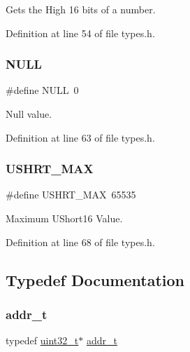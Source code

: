 Gets the High 16 bits of a number. 



Definition at line 54 of file types.\+h.

\mbox{\label{a00104_a070d2ce7b6bb7e5c05602aa8c308d0c4_a070d2ce7b6bb7e5c05602aa8c308d0c4}} 
\subsubsection{\texorpdfstring{N\+U\+LL}{NULL}}
{\footnotesize\ttfamily \#define N\+U\+LL~0}



Null value. 



Definition at line 63 of file types.\+h.

\mbox{\label{a00104_a689b119da994dece91d44b5aeac643ed_a689b119da994dece91d44b5aeac643ed}} 
\subsubsection{\texorpdfstring{U\+S\+H\+R\+T\+\_\+\+M\+AX}{USHRT\_MAX}}
{\footnotesize\ttfamily \#define U\+S\+H\+R\+T\+\_\+\+M\+AX~65535}



Maximum U\+Short16 Value. 



Definition at line 68 of file types.\+h.



\subsection{Typedef Documentation}
\mbox{\label{a00104_a295f71165288684c38c6bb836fbb3c59_a295f71165288684c38c6bb836fbb3c59}} 
\subsubsection{\texorpdfstring{addr\+\_\+t}{addr\_t}}
{\footnotesize\ttfamily typedef \hyperlink{a00104_a435d1572bf3f880d55459d9805097f62_a435d1572bf3f880d55459d9805097f62}{uint32\+\_\+t}$\ast$ \hyperlink{a00104_a295f71165288684c38c6bb836fbb3c59_a295f71165288684c38c6bb836fbb3c59}{addr\+\_\+t}}



